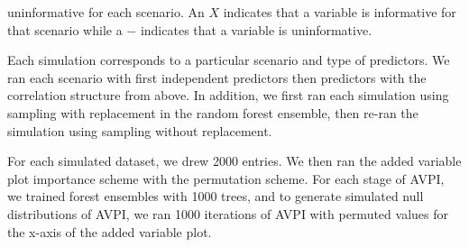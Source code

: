 \documentclass[12pt,twoside]{reedthesis}
\theoremstyle{definition}
\theoremstyle{definition}
\theoremstyle{definition}
\theoremstyle{remark}
\begin{document}
uninformative for each scenario. An \(X\) indicates that a variable is
informative for that scenario while a \(-\) indicates that a variable is
uninformative. \par
\begin{table}

\caption{\label{tab:unnamed-chunk-4}Informative and Uninformative Variables For Each Scenario}
\centering
{}
\end{table}
Each simulation corresponds to a particular scenario and type of
predictors. We ran each scenario with first independent predictors then
predictors with the correlation structure from above. In addition, we
first ran each simulation using sampling with replacement in the random
forest ensemble, then re-ran the simulation using sampling without
replacement. \par
\begin{table}

\caption{\label{tab:unnamed-chunk-5}Which Scenario and Set of Predictors Each Simulation Corresponds to}
\centering
{}
\end{table}
For each simulated dataset, we drew 2000 entries. We then ran the added
variable plot importance scheme with the permutation scheme. For each
stage of AVPI, we trained forest ensembles with 1000 trees, and to
generate simulated null distributions of AVPI, we ran 1000 iterations of
AVPI with permuted values for the x-axis of the added variable plot.
\par
\end{document}
